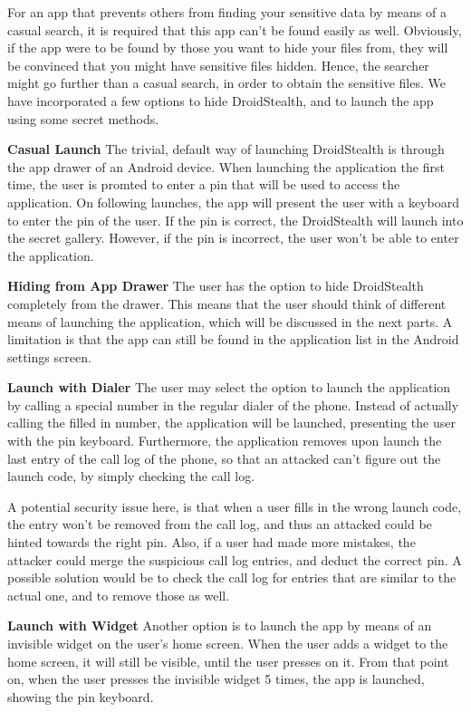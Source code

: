 For an app that prevents others from finding your sensitive
data by means of a casual search, it is required that this app
can't be found easily as well. Obviously, if the app were to be
found by those you want to hide your files from, they will be
convinced that you might have sensitive files hidden. Hence, the
searcher might go further than a casual search, in order to
obtain the sensitive files. We have incorporated a few options to hide 
DroidStealth, and to launch the app using some secret methods.

\textbf{Casual Launch}
The trivial, default way of launching DroidStealth is through the app drawer of an Android device. 
When launching the application the first time, the user is promted to enter a pin that will be used to access the application.
On following launches, the app will present the user with a keyboard to enter the pin of the user. If the pin is correct, the 
DroidStealth will launch into the secret gallery. However, if the pin is incorrect, the user won't be able to enter the application.


\textbf{Hiding from App Drawer}
The user has the option to hide DroidStealth completely from the drawer. This 
means that the user should think of different means of launching the application, 
which will be discussed in the next parts. A limitation is that the app can still be found
in the application list in the Android settings screen. 

\textbf{Launch with Dialer}
The user may select the option to launch the application by calling a special number
in the regular dialer of the phone. Instead of actually calling the filled in number, the
application will be launched, presenting the user with the pin keyboard. Furthermore,
the application removes upon launch the last entry of the call log of the phone, so that
an attacked can't figure out the launch code, by simply checking the call log.

A potential security issue here, is that when a user fills in the wrong launch code, the 
entry won't be removed from the call log, and thus an attacked could be hinted towards
the right pin. Also, if a user had made more mistakes, the attacker could merge the 
suspicious call log entries, and deduct the correct pin. A possible solution would be to
check the call log for entries that are similar to the actual one, and to remove those as well.

\textbf{Launch with Widget}
Another option is to launch the app by means of an invisible widget on the user's home screen. 
When the user adds a widget to the home screen, it will still be visible, until the user presses on it. 
From that point on, when the user presses the invisible widget 5 times, the app is launched, showing the pin keyboard.

